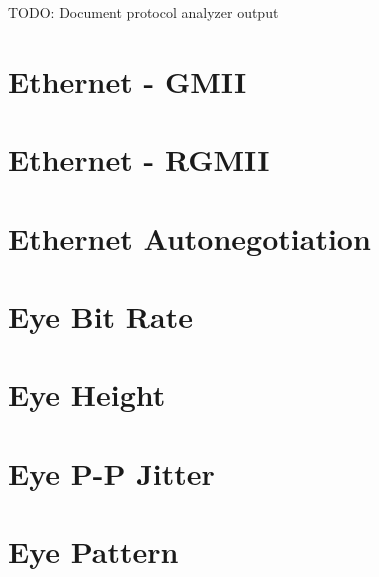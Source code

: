 TODO: Document protocol analyzer output

\pagebreak
\section{Ethernet - GMII}

\pagebreak
\section{Ethernet - RGMII}

\pagebreak
\section{Ethernet Autonegotiation}

\pagebreak
\section{Eye Bit Rate}

\pagebreak
\section{Eye Height}

\pagebreak
\section{Eye P-P Jitter}

\pagebreak
\section{Eye Pattern}

\pagebreak

